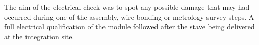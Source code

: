 
\label{subsec:ElecFuncQC}
The aim of the electrical check was to spot any possible damage that may had occurred during one of the assembly, wire-bonding or metrology survey steps. A full electrical qualification of the module followed after the stave being delivered at the integration site.


